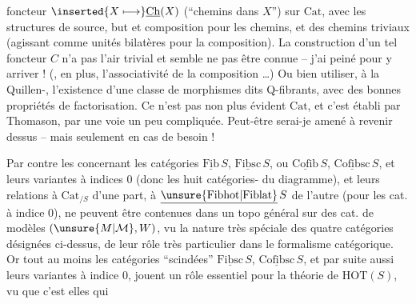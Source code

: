 foncteur $\inserted{X\longmapsto}\underline{\mathrm{Ch}}(X)$ (``chemins dans $X$'') sur $\mathrm{Cat}$, avec les structures de source, but et composition pour les chemins, et des chemins triviaux (agissant comme unités bilatères pour la composition). La construction d'un tel foncteur $C$ n'a pas l'air trivial et semble ne pas être connue -- j'ai peiné pour y arriver ! (, en plus, l'associativité de la composition \ldots) Ou bien utiliser, à la Quillen-, l'existence d'une classe de morphismes dits Q-fibrants, avec des bonnes propriétés de factorisation.
Ce n'est pas non plus évident  $\mathrm{Cat}$, et c'est établi par Thomason, par une voie un peu compliquée. Peut-être serai-je amené à revenir dessus -- mais seulement en cas de besoin !

Par contre les  concernant les catégories $\underline{\mathrm{Fib}}\,S$, $\underline{\mathrm{Fibsc}}\,S$, ou $\underline{\mathrm{Cofib}}\,S$, $\underline{\mathrm{Cofibsc}}\,S$, et leurs variantes à indices $0$ (donc les huit catégories- du diagramme), et leurs relations à $\mathrm{Cat}_{/S}$ d'une part, à $\underline{\unsure{\mathrm{Fibhot}|\mathrm{Fiblat}}}\,S$ de l'autre (pour les cat. à indice $0$), ne peuvent être contenues dans un topo général sur des  cat. de modèles $(\unsure{M|\mathcal M},W)$,  vu la nature très spéciale des quatre catégories désignées ci-dessus, de leur rôle très particulier dans le  formalisme catégorique. Or tout au moins les catégories ``scindées'' $\underline{\mathrm{Fibsc}}\,S$, $\underline{\mathrm{Cofibsc}}\,S$, et par suite aussi leurs variantes à indice $0$, jouent un rôle essentiel pour la théorie de $\mathrm{HOT}(S)$, vu que c'est elles qui
